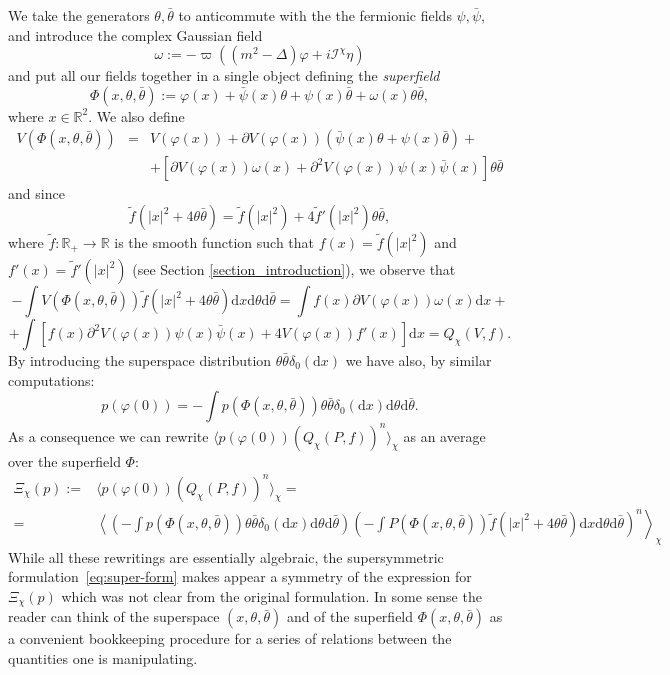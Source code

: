 \documentclass[a4paper,10pt]{article}
\newcommand{\assign}{:=}
\newcommand{\mathd}{\mathrm{d}}
\newcommand{\tmtextit}[1]{{\itshape{#1}}}
\begin{document}
We take the generators $\theta, \bar{\theta}$ to anticommute with the the
fermionic fields $\psi, \bar{\psi}$, and introduce the complex Gaussian field
\[ \omega \assign - \varpi ((m^2 - \Delta) \varphi + i \mathcal{I}^{\chi}
   \eta) \]
and put all our fields together in a single object defining the
\tmtextit{superfield}
\[ \Phi (x, \theta, \bar{\theta}) \assign \varphi (x) + \bar{\psi} (x) \theta
   + \psi (x) \bar{\theta} + \omega (x) \theta \bar{\theta}, \]
where $x \in \mathbb{R}^2$. We also define
\begin{eqnarray*}
  V (\Phi (x, \theta, \bar{\theta})) & = & V (\varphi (x)) + \partial V
  (\varphi (x)) (\bar{\psi} (x) \theta + \psi (x) \bar{\theta}) +\\
  &  & + [\partial V (\varphi (x)) \omega (x) + \partial^2 V (\varphi (x))
  \psi (x) \bar{\psi} (x)] \theta \bar{\theta}
\end{eqnarray*}
and since
\[ \tilde{f} (| x |^2 + 4 \theta \bar{\theta}) = \tilde{f} (| x |^2) + 4
   \tilde{f}' (| x |^2) \theta \bar{\theta}, \]
where $\tilde{f} : \mathbb{R}_+ \rightarrow \mathbb{R}$ is the smooth function
such that $f (x) = \tilde{f} (| x |^2)$ and $f' (x) = \tilde{f}' (| x |^2)$
(see Section \ref{section_introduction}), we observe that
\[ - \int V (\Phi (x, \theta, \bar{\theta})) \tilde{f} (| x |^2 + 4 \theta
   \bar{\theta}) \mathd x \mathd \theta \mathd \bar{\theta} = \int f (x)
   \partial V (\varphi (x)) \omega (x) \mathd x + \]
\[ + \int [f (x) \partial^2 V (\varphi (x)) \psi (x) \bar{\psi} (x) + 4 V
   (\varphi (x)) f' (x)] \mathd x = Q_{\chi} (V, f) . \]
By introducing the superspace distribution $\theta \bar{\theta} \delta_0
(\mathd x)$ we have also, by similar computations:
\[ p (\varphi (0)) = - \int p (\Phi (x, \theta, \bar{\theta})) \theta
   \bar{\theta} \delta_0 (\mathd x) \mathd \theta \mathd \bar{\theta} . \]
As a consequence we can rewrite $\langle p (\varphi (0)) (Q_{\chi} (P, f))^n
\rangle_{\chi}$ as an average over the superfield $\Phi$:
\begin{equation}
  \begin{aligned}
    \Xi_{\chi} (p) \assign & \langle p (\varphi (0)) (Q_{\chi} (P, f))^n
    \rangle_{\chi} =\\
    = & \left\langle \left( - \int p (\Phi (x, \theta, \bar{\theta})) \theta
    \bar{\theta} \delta_0 (\mathd x) \mathd \theta \mathd \bar{\theta} \right)
    \right.\left. \left( - \int P (\Phi (x, \theta, \bar{\theta}))
    \tilde{f} (| x |^2 + 4 \theta \bar{\theta}) \mathd x \mathd \theta \mathd
    \bar{\theta} \right)^n \right\rangle_{\chi}
  \end{aligned}
  \label{eq:super-form}
\end{equation}
While all these rewritings are essentially algebraic, the supersymmetric
formulation~{\eqref{eq:super-form}} makes appear a symmetry of the expression
for $\Xi_{\chi} (p)$ which was not clear from the original formulation. In
some sense the reader can think of the superspace $(x, \theta, \bar{\theta})$
and of the superfield $\Phi (x, \theta, \bar{\theta})$ as a convenient
bookkeeping procedure for a series of relations between the quantities one is
manipulating.
\end{document}

